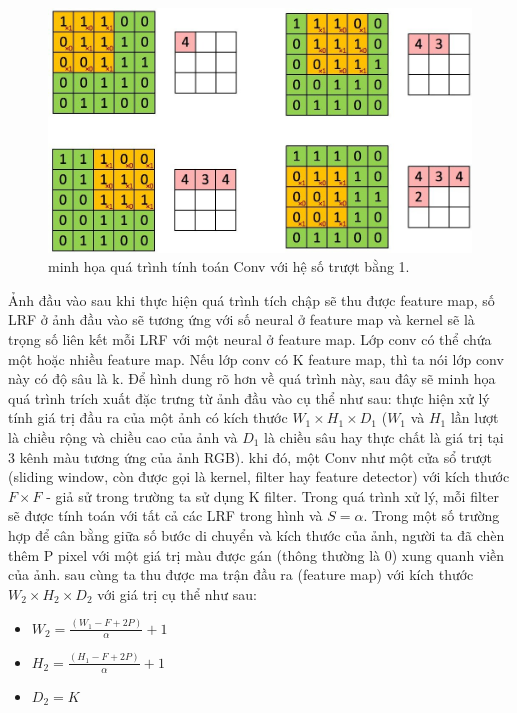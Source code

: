 \begin{figure}[ht]
  			\begin{center}
    				\includegraphics[scale=0.4]{con4}
    				\caption[Caption for LOF]{minh họa quá trình tính toán Conv với hệ số trượt bằng 1.} 
    				\label{Conv4}
  			\end{center}
\end{figure}	

	Ảnh đầu vào sau khi thực hiện quá trình tích chập sẽ thu được feature map, số LRF ở ảnh đầu vào sẽ tương ứng với số neural ở feature map và kernel sẽ là trọng số liên kết mỗi LRF với một neural ở feature map. Lớp conv có thể chứa một hoặc nhiều feature map. Nếu lớp conv có K feature map, thì ta nói lớp conv này có độ sâu là k.
	Để hình dung rõ hơn về quá trình này, sau đây sẽ minh họa quá trình trích xuất đặc trưng từ ảnh đầu vào cụ thể như sau: thực hiện xử lý tính giá trị đầu ra của một  ảnh có kích thước $W_1 \times H_1 \times D_1$ ($W_1$ và $H_1$ lần lượt là chiều rộng và chiều cao của ảnh và $D_1$ là chiều sâu hay thực chất là giá trị tại 3 kênh màu tương ứng của ảnh RGB). khi đó, một Conv như một cửa sổ trượt (sliding window, còn được gọi là kernel, filter hay feature detector) với kích thước $F \times F$ - giả sử trong trường ta sử dụng K filter. Trong quá trình xử lý, mỗi filter sẽ được tính toán với tất cả các LRF trong hình và $S = \alpha$. Trong một số trường hợp để cân bằng giữa số bước di chuyển và kích thước của ảnh, người ta đã chèn thêm P pixel với một giá trị màu được gán (thông thường là 0) xung quanh viền của ảnh. sau cùng ta thu được ma trận đầu ra (feature map) với kích thước $W_2 \times H_2 \times D_2$ với giá trị cụ thể như sau: \par
	\begin{itemize}
		\item $W_2 = \frac{(W_1 - F + 2P)}{\alpha} + 1$
		\item $H_2 = \frac{(H_1 - F + 2P)}{\alpha} + 1$
		\item $D_2 = K$  
	\end{itemize}
	
